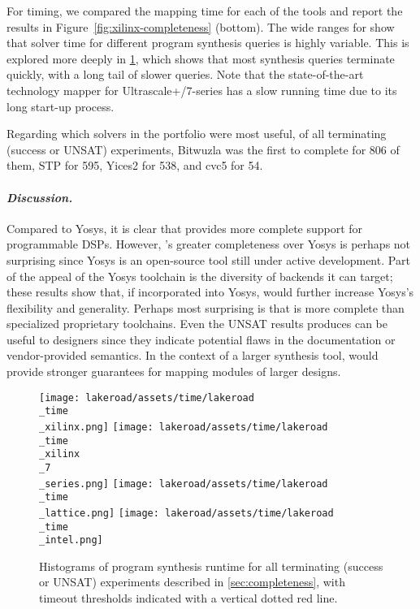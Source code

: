 For timing, we compared the mapping time for each
  of the tools
  and report the results
  in Figure~\ref{fig:xilinx-completeness} (bottom).
The wide ranges for \lr
  show that solver time for different
  program synthesis queries
  is highly variable.
This is explored more deeply in
  \cref{fig:lakeroad-synth-time},
  which shows that most synthesis queries
  terminate quickly,
  with a long tail of slower queries.
Note that the state-of-the-art technology
mapper for Ultrascale+/7-series has a slow running time
  due to its long start-up process.\tighten

Regarding which solvers
  in the portfolio were
  most useful,
  of all terminating
  (success or UNSAT)
  \lr experiments,
  Bitwuzla was the first
  to complete
  for 806 of them,
  STP for 595,
  Yices2 for 538,
  and cvc5 for 54.


\paragraph{\textnormal{\textit{\textbf{Discussion.}}}}
Compared to Yosys,
  it is clear that
  \lr provides more complete support
  for
  programmable DSPs.
However, \lr's greater completeness
  over Yosys
  is perhaps not surprising since 
  Yosys is an open-source tool
  still under active development.
Part of the appeal
  of the Yosys toolchain
  is the diversity of backends
  it can target;
  these results show that, if incorporated
  into Yosys, \lr
  would further increase
  Yosys's flexibility and generality.
Perhaps most surprising
  is that \lr is more complete
  than
  specialized proprietary toolchains. 
Even the UNSAT results \lr produces 
  can be useful to designers 
  since they indicate
  potential flaws
  in the documentation or vendor-provided semantics.
In the context of a larger
  synthesis tool, \lr
  would provide stronger
  guarantees for mapping
  modules of larger designs.





\begin{figure}
    \centering
    \texttt{[image: lakeroad/assets/time/lakeroad\\\_time\\\_xilinx.png]}
    \texttt{[image: lakeroad/assets/time/lakeroad\\\_time\\\_xilinx\\\_7\\\_series.png]}
    \texttt{[image: lakeroad/assets/time/lakeroad\\\_time\\\_lattice.png]}
    \texttt{[image: lakeroad/assets/time/lakeroad\\\_time\\\_intel.png]}
\caption{
Histograms of \lr program synthesis runtime
  for all terminating
  (success or UNSAT) \lr experiments
  described in \cref{sec:completeness}, with timeout thresholds indicated with a vertical
  dotted red line.
}
    \label{fig:lakeroad-synth-time}
\end{figure}

